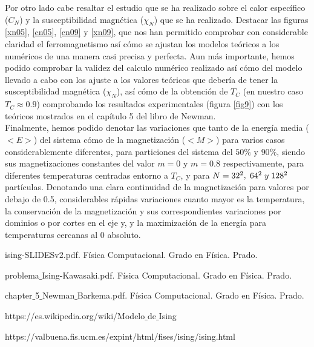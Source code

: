 \documentclass[12pt,paper]{article}
\begin{document}
Por otro lado cabe resaltar el estudio que se ha realizado sobre el calor específico ($C_N$) y la susceptibilidad magnética ($\chi_N$) que se ha realizado. Destacar las figuras \ref{xn05}, \ref{cn05}, \ref{cn09} y \ref{xn09}, que nos han permitido comprobar con considerable claridad el ferromagnetismo así cómo se ajustan los modelos teóricos a los numéricos de una manera casi precisa y perfecta. Aun más importante, hemos podido comprobar la validez del calculo numérico realizado así cómo del modelo llevado a cabo con los ajuste a los valores teóricos que debería de tener la susceptibilidad magnética ($\chi_N$), así cómo de la obtención de $T_C$ (en nuestro caso $T_C \approx 0.9$) comprobando los resultados experimentales (figura \ref{fig9}) con los teóricos mostrados en el capítulo 5 del libro de Newman.\\

Finalmente, hemos podido denotar las variaciones que tanto de la energía media ($<E>$) del sistema cómo de la magnetización ($<M>$) para varios casos considerablemente diferentes, para particiones del sistema del $50 \%$ y $90 \%$, siendo sus magnetizaciones constantes del valor $m=0$ y $m=0.8$ respectivamente, para diferentes temperaturas centradas entorno a $T_C$, y para $N= 32^2, \hspace{1mm} 64^2 \hspace{1mm} y \hspace{1mm} 128^2$ partículas. Denotando una clara continuidad de la magnetización para valores por debajo de 0.5, considerables rápidas variaciones cuanto mayor es la temperatura, la conservación de la magnetización y sus correspondientes variaciones por dominios o por cortes en el eje y, y la maximización de la energía para temperaturas cercanas al 0 absoluto.



\newpage
\begin{thebibliography}{}

\bibitem{}
ising-SLIDESv2.pdf. Física Computacional. Grado en Física. Prado.

\bibitem{}
problema$\_$Ising-Kawasaki.pdf. Física Computacional. Grado en Física. Prado.

\bibitem{}
chapter$\_$5$\_$Newman$\_$Barkema.pdf. Física Computacional. Grado en Física. Prado.

\bibitem{}
https://es.wikipedia.org/wiki/Modelo$\_$de$\_$Ising

\bibitem{}
https://valbuena.fis.ucm.es/expint/html/fises/ising/ising.html

\end{thebibliography}
\end{document}
